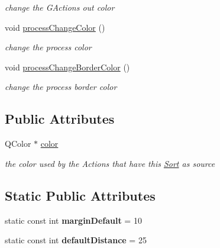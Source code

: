 \begin{DoxyCompactItemize}
\begin{DoxyCompactList}\small\item\em change the G\+Actions out color \end{DoxyCompactList}\item 
\hypertarget{classGSort_afbcbe962474f11f1aa25c215c4c334dc}{void \hyperlink{classGSort_afbcbe962474f11f1aa25c215c4c334dc}{process\+Change\+Color} ()}\label{classGSort_afbcbe962474f11f1aa25c215c4c334dc}

\begin{DoxyCompactList}\small\item\em change the process color \end{DoxyCompactList}\item 
\hypertarget{classGSort_a527cc68e3c8084562803f9411cc9f4b0}{void \hyperlink{classGSort_a527cc68e3c8084562803f9411cc9f4b0}{process\+Change\+Border\+Color} ()}\label{classGSort_a527cc68e3c8084562803f9411cc9f4b0}

\begin{DoxyCompactList}\small\item\em change the process border color \end{DoxyCompactList}\end{DoxyCompactItemize}
\subsection*{Public Attributes}
\begin{DoxyCompactItemize}
\item 
\hypertarget{classGSort_afdedfe6a6028c586a755315351eee309}{Q\+Color $\ast$ \hyperlink{classGSort_afdedfe6a6028c586a755315351eee309}{color}}\label{classGSort_afdedfe6a6028c586a755315351eee309}

\begin{DoxyCompactList}\small\item\em the color used by the Actions that have this \hyperlink{classSort}{Sort} as source \end{DoxyCompactList}\end{DoxyCompactItemize}
\subsection*{Static Public Attributes}
\begin{DoxyCompactItemize}
\item 
\hypertarget{classGSort_a17bdbcd4d2c88f106390628415c8dac8}{static const int {\bfseries margin\+Default} = 10}\label{classGSort_a17bdbcd4d2c88f106390628415c8dac8}

\item 
\hypertarget{classGSort_a00302d36929b2d641d11a0dbf3bca334}{static const int {\bfseries default\+Distance} = 25}\label{classGSort_a00302d36929b2d641d11a0dbf3bca334}

\end{DoxyCompactItemize}
